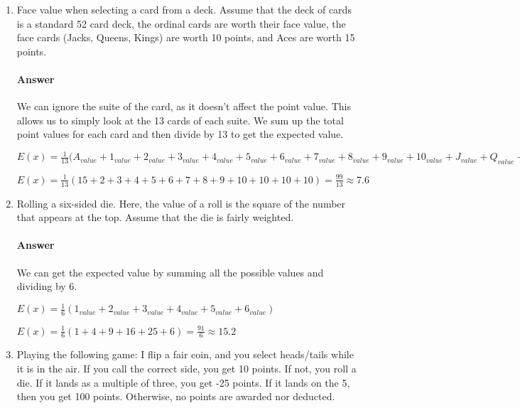 \documentclass{article}
\begin{document}
\begin{enumerate}
    \item Face value when selecting a card from a deck.  Assume that the deck of
        cards is a standard 52 card deck, the ordinal cards are worth their face
        value, the face cards (Jacks, Queens, Kings) are
        worth 10 points, and Aces are worth 15 points.
        
        \paragraph{Answer} We can ignore the suite of the card, as it doesn't affect the point value. This allows us to simply look at the 13 cards of each suite. We sum up the total point values for each card and then divide by 13 to get the expected value.
        
        $E(x) = \frac{1}{13}(A_{value} + 1_{value} + 2_{value} + 3_{value} + 4_{value} + 5_{value} + 6_{value} + 7_{value} + 8_{value} + 9_{value} + 10_{value} + J_{value} + Q_{value} + K_{value}$
        
        $E(x) = \frac{1}{13}(15 + 2 + 3 + 4 + 5 + 6 + 7 + 8 + 9 + 10 + 10 + 10 + 10) = \frac{99}{13} \approx 7.6$
        
    \item Rolling a six-sided die.  Here, the value of a roll is the square of
        the number that appears at the top.  Assume that the die is fairly
        weighted.
        
        \paragraph{Answer} We can get the expected value by summing all the possible values and dividing by 6.
        
        $E(x) = \frac{1}{6}(1_{value} + 2_{value} + 3_{value} + 4_{value} + 5_{value} + 6_{value})$
        
        $E(x) = \frac{1}{6}(1 + 4 + 9 + 16 + 25 + 6) = \frac{91}{6} \approx 15.2$
        
    \item Playing the following game: I flip a fair coin, and you select
        heads/tails while it is in the air.  If you call the correct side,
        you get 10 points.  If not, you roll a die.  If it lands as a
        multiple of three, you get -25 points.
        If it lands on the 5, then you get 100 points.  Otherwise, no points are
        awarded nor deducted.
        

\end{enumerate}
\end{document}

